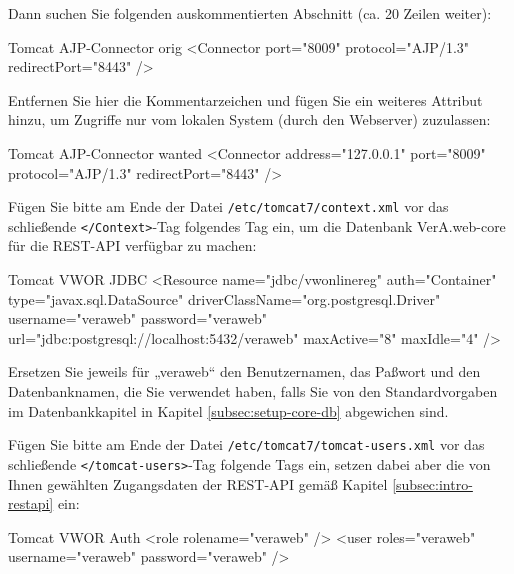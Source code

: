 \begin{minipage}{\textwidth}
Dann suchen Sie folgenden auskommentierten Abschnitt (ca. 20 Zeilen weiter):

\begin{lstdump}[language=XML]{Tomcat AJP-Connector orig}
<Connector port="8009" protocol="AJP/1.3" redirectPort="8443" />
\end{lstdump}

Entfernen Sie hier die Kommentarzeichen und fügen Sie ein weiteres Attribut
hinzu, um Zugriffe nur vom lokalen System (durch den Webserver) zuzulassen:

\begin{lstdump}[language=XML]{Tomcat AJP-Connector wanted}
<Connector address="127.0.0.1" port="8009" protocol="AJP/1.3" redirectPort="8443" />
\end{lstdump}
\end{minipage}

\begin{minipage}{\textwidth}
Fügen Sie bitte am Ende der Datei \texttt{/etc/tomcat7/context.xml} vor
das schließende \texttt{</Context>}-Tag folgendes Tag ein, um die
 \ifupgradeanleitung
  Datenbank VerA.web-core
 \else%
 \fi%
für die REST-API verfügbar zu machen:

\begin{lstdump}[language=XML]{Tomcat VWOR JDBC}
<Resource name="jdbc/vwonlinereg" auth="Container" type="javax.sql.DataSource"
 driverClassName="org.postgresql.Driver" username="veraweb" password="veraweb"
 url="jdbc:postgresql://localhost:5432/veraweb" maxActive="8" maxIdle="4" />
\end{lstdump}

Ersetzen Sie jeweils für „veraweb“ den Benutzernamen, das Paßwort und den
Datenbanknamen, die Sie verwendet haben, falls Sie von den Standardvorgaben
 \ifupgradeanleitung
  im Datenbankkapitel
 \else%
  in Kapitel \ref{subsec:setup-core-db}
 \fi%
abgewichen sind.
\end{minipage}

\begin{minipage}{\textwidth}
Fügen Sie bitte am Ende der Datei \texttt{/etc/tomcat7/tomcat-users.xml} vor
das schließende \texttt{</tomcat-users>}-Tag folgende Tags ein, setzen dabei
aber die von Ihnen gewählten Zugangsdaten der REST-API gemäß Kapitel
\ref{subsec:intro-restapi} ein:

\begin{lstdump}[language=XML]{Tomcat VWOR Auth}
<role rolename="veraweb" />
<user roles="veraweb" username="veraweb" password="veraweb" />
\end{lstdump}
\ifupgradeanleitung\else\label{manual:restpw}\fi%
\end{minipage}

